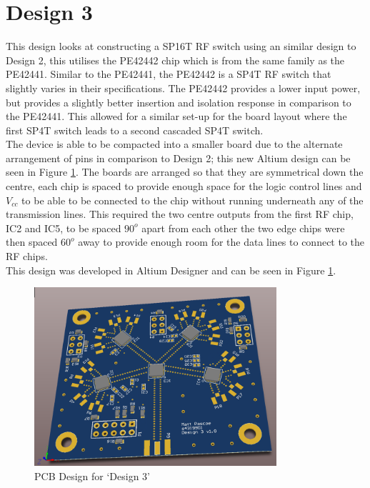 \documentclass[12pt,openany,a4paper]{book}
\begin{document}
\section{Design 3}		\label{sec:design3}
This design looks at constructing a SP16T RF switch using an similar design to Design 2, this utilises the PE42442 chip which is from the same family as the PE42441. Similar to the PE42441, the PE42442 is a SP4T RF switch that slightly varies in their specifications. The PE42442 provides a lower input power, but provides a slightly better insertion and isolation response in comparison to the PE42441. This allowed for a similar set-up for the board layout where the first SP4T switch leads to a second cascaded SP4T switch.\\[0.2cm]
The device is able to be compacted into a smaller board due to the alternate arrangement of pins in comparison to Design 2; this new Altium design can be seen in Figure \ref{fig:design3}. The boards are arranged so that they are symmetrical down the centre, each chip is spaced to provide enough space for the logic control lines and $V_{cc}$ to be able to be connected to the chip without running underneath any of the transmission lines. This required the two centre outputs from the first RF chip, IC2 and IC5, to be spaced $90^o$ apart from each other the two edge chips were then spaced $60^o$ away to provide enough room for the data lines to connect to the RF chips.\\[0.2cm]
This design was developed in Altium Designer and can be seen in Figure \ref{fig:design3}.
\begin{figure}[H]
	\centering
    \includegraphics[width=0.8\textwidth]{design3_pcb.png}
	\caption{PCB Design for `Design 3'}
	\label{fig:design3}
\end{figure} 
\end{document}
